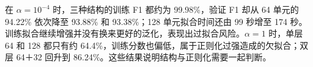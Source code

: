 在 $\alpha=10^{-4}$ 时，三种结构的训练 F1 都约为 99.98\%，验证 F1 却从 64 单元的 94.22\% 依次降至 93.88\% 和 93.38\%；128 单元拟合时间还由 99 秒增至 174 秒。训练拟合继续增强并没有换来更好的泛化，表现出过拟合风险。$\alpha=1$ 时，单层 64 和 128 都只有约 64.4\%，训练分数也偏低，属于正则化过强造成的欠拟合；双层 64＋32 回升到 86.24\%。这些结果说明结构与正则化需要一起判断。
